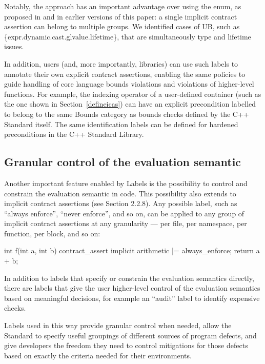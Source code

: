 Notably, the \cite{P3400R1} approach has an important advantage over using the  enum, as proposed in \cite{P3081R1} and in earlier versions of this paper: a single implicit contract assertion can belong to multiple groups. We identified cases of UB, such as \{expr.dynamic.cast.glvalue.lifetime\}, that are simultaneously type and lifetime issues.

In addition, users (and, more importantly, libraries) can use such labels to annotate their own explicit contract assertions, enabling the same policies to guide handling of core language bounds violations and violations of higher-level functions. For example, the indexing operator of a user-defined container (such as the one shown in Section~\ref{defineicas}) can have an explicit precondition labelled to belong to the same Bounds category as bounds checks defined by the C++ Standard itself. The same identification labels can be defined for hardened preconditions in the C++ Standard Library.

\subsection{Granular control of the evaluation semantic}
\label{semantic}

Another important feature enabled by Labels is the possibility to control and constrain the evaluation semantic in code. This possibility also extends to implicit contract assertions (see \cite{P3400R1} Section 2.2.8). Any possible label, such as ``always enforce'', ``never enforce'', and so on, can be applied to any group of implicit contract assertions at any granularity --- per file, per namespace, per function, per block, and so on:

\begin{codeblock}
int f(int a, int b) {
  contract_assert implicit arithmetic |= always_enforce;
  return a + b;
}
\end{codeblock}

In addition to labels that specify or constrain the evaluation semantics directly, there are labels that give the user higher-level control of the evaluation semantics based on meaningful decisions, for example an ``audit'' label to identify expensive checks.

Labels used in this way provide granular control when needed, allow the Standard to
specify useful groupings of different sources of program defects, and give developers the freedom they
need to control mitigations for those defects based on exactly the criteria needed for their environments.

